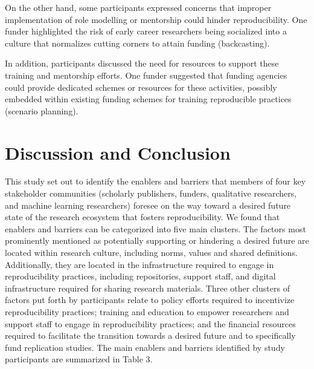 \documentclass[authordate, meta]{jote-new-article}
\begin{document}
	On the other hand, some participants expressed concerns that improper implementation of role modelling or mentorship could hinder reproducibility. One funder highlighted the risk of early career researchers being socialized into a culture that normalizes cutting corners to attain funding (backcasting).







	In addition, participants discussed the need for resources to support these training and mentorship efforts. One funder suggested that funding agencies could provide dedicated schemes or resources for these activities, possibly embedded within existing funding schemes for training reproducible practices (scenario planning).



	\section{Discussion and Conclusion }



	This study set out to identify the enablers and barriers that members of four key stakeholder communities (scholarly publishers, funders, qualitative researchers, and machine learning researchers) foresee on the way toward a desired future state of the research ecosystem that fosters reproducibility. We found that enablers and barriers can be categorized into five main clusters. The factors most prominently mentioned as potentially supporting or hindering a desired future are located within research culture, including norms, values and shared definitions. Additionally, they are located in the infrastructure required to engage in reproducibility practices, including repositories, support staff, and digital infrastructure required for sharing research materials. Three other clusters of factors put forth by participants relate to policy efforts required to incentivize reproducibility practices; training and education to empower researchers and support staff to engage in reproducibility practices; and the financial resources required to facilitate the transition towards a desired future and to specifically fund replication studies. The main enablers and barriers identified by study participants are summarized in Table 3.
\end{document}
